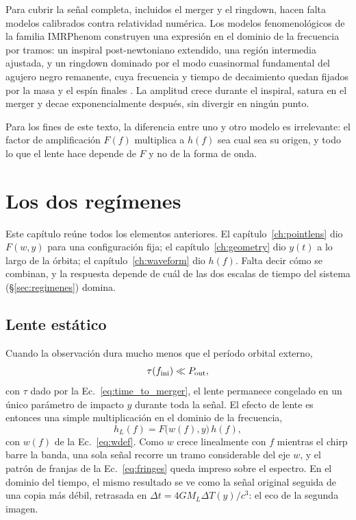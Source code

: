 \documentclass[11pt,a4paper,openany]{book}
\begin{document}
Para cubrir la se\~nal completa, incluidos el merger y el ringdown, hacen falta
modelos calibrados contra relatividad num\'erica. Los modelos
fenomenol\'ogicos de la familia IMRPhenom \citep{Khan2016} construyen una
expresi\'on en el dominio de la frecuencia por tramos: un inspiral
post-newtoniano extendido, una regi\'on intermedia ajustada, y un ringdown
dominado por el modo cuasinormal fundamental del agujero negro remanente, cuya
frecuencia y tiempo de decaimiento quedan fijados por la masa y el esp\'in
finales \citep{BertiCardosoWill2006}. La amplitud crece durante el inspiral,
satura en el merger y decae exponencialmente despu\'es, sin divergir en ning\'un
punto.

Para los fines de este texto, la diferencia entre uno y otro modelo es
irrelevante: el factor de amplificaci\'on $F(f)$ multiplica a $h(f)$ sea cual
sea su origen, y todo lo que el lente hace depende de $F$ y no de la forma de
onda.

\chapter{Los dos reg\'imenes}
\label{ch:regimes}

Este cap\'itulo re\'une todos los elementos anteriores. El
cap\'itulo~\ref{ch:pointlens} dio $F(w,y)$ para una configuraci\'on fija; el
cap\'itulo~\ref{ch:geometry} dio $y(t)$ a lo largo de la \'orbita; el
cap\'itulo~\ref{ch:waveform} dio $h(f)$. Falta decir c\'omo se combinan, y la
respuesta depende de cu\'al de las dos escalas de tiempo del sistema
(\S\ref{sec:regimenes}) domina.

\section{Lente est\'atico}
\label{sec:caseA}

Cuando la observaci\'on dura mucho menos que el per\'iodo orbital externo,
\begin{equation}
  \tau(f_{\rm ini})\ll P_\mathrm{out} ,
  \label{eq:static_condition}
\end{equation}
con $\tau$ dado por la Ec.~\eqref{eq:time_to_merger}, el lente permanece
congelado en un \'unico par\'ametro de impacto $y$ durante toda la se\~nal. El
efecto de lente es entonces una simple multiplicaci\'on en el dominio de la
frecuencia,
\begin{equation}
  h_L(f)=F\big(w(f),y\big)\,h(f) ,
  \label{eq:caseA}
\end{equation}
con $w(f)$ de la Ec.~\eqref{eq:wdef}. Como $w$ crece linealmente con $f$
mientras el chirp barre la banda, una sola se\~nal recorre un tramo
considerable del eje $w$, y el patr\'on de franjas de la
Ec.~\eqref{eq:fringes} queda impreso sobre el espectro. En el dominio del
tiempo, el mismo resultado se ve como la se\~nal original seguida de una copia
m\'as d\'ebil, retrasada en $\Delta t=4GM_L\Delta T(y)/c^{3}$: el eco de la
segunda imagen.
\end{document}
